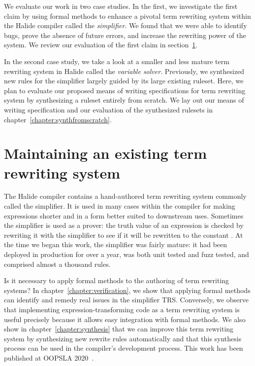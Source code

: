 We evaluate our work in two case studies. In the first, we investigate the first claim by using formal methods to enhance a pivotal term rewriting system within the Halide compiler called the \emph{simplifier}. We found that we were able to identify bugs, prove the absence of future errors, and increase the rewriting power of the system. We review our evaluation of the first claim in section~\ref{sec:prior}. 

In the second case study, we take a look at a smaller and less mature term rewriting system in Halide called the \emph{variable solver}. Previously, we synthesized new rules for the simplifier largely guided by its large existing ruleset. Here, we plan to evaluate our proposed means of writing specifications for term rewriting system by synthesizing a ruleset entirely from scratch. We lay out our means of writing specification and our evaluation of the synthesized rulesets in chapter~\ref{chapter:synthfromscratch}.

\section{Maintaining an existing term rewriting system}
\label{sec:prior}

The Halide compiler contains a hand-authored term rewriting system commonly called the simplifier. It is used in many cases within the compiler for making expressions shorter and in a form better suited to downstream uses. Sometimes the simplifier is used as a prover: the truth value of an expression is checked by rewriting it with the simplifier to see if it will be rewritten to the constant \htrue. At the time we began this work, the simplifier was fairly mature: it had been deployed in production for over a year, was both unit tested and fuzz tested, and comprised almost a thousand rules.

Is it necessary to apply formal methods to the authoring of term rewriting systems? In chapter~\ref{chapter:verification}, we show that applying formal methods can identify and remedy real issues in the simplifier TRS. Conversely, we observe that implementing expression-transforming code as a term rewriting system is useful precisely because it allows easy integration with formal methods. We also show in chapter~\ref{chapter:synthesis} that we can improve this term rewriting system by synthesizing new rewrite rules automatically and that this synthesis process can be used in the compiler's development process. This work has been published at OOPSLA 2020~\citep{newcomb2020verifying}.

